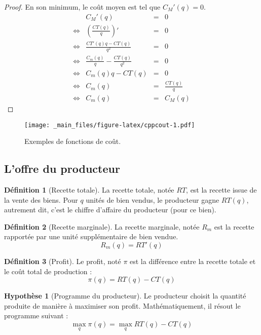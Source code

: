 \documentclass[
  a4paper,
]{book}
\theoremstyle{definition}
\newtheorem{definition}{Définition}[chapter]
\theoremstyle{definition}
\theoremstyle{definition}
\theoremstyle{definition}
\newtheorem{hypothesis}{Hypothèse}[chapter]
\theoremstyle{remark}
\begin{document}
\begin{proof}
En son minimum, le coût moyen est tel que \(C_M'(q)=0\).
\[
\begin{array}{crcl}
&C_M'(q)&=&0\\
\Leftrightarrow & \left(\frac{CT(q)}{q}\right)'&=& 0\\
\Leftrightarrow & \frac{CT'(q)q-CT(q)}{q^2}&=& 0\\
\Leftrightarrow & \frac{C_m(q)}{q}-\frac{CT(q)}{q^2}&=& 0\\
\Leftrightarrow & C_m(q)q-CT(q)&=& 0\\
\Leftrightarrow & C_m(q)&=& \frac{CT(q)}{q}\\
\Leftrightarrow & C_m(q)&=& C_M(q)
\end{array}
\]
\end{proof}

\begin{figure}
\centering
\texttt{[image: \_main\_files/figure-latex/cppcout-1.pdf]}
\caption{\label{fig:cppcout}Exemples de fonctions de coût.}
\end{figure}

\hypertarget{loffre-du-producteur}{%
\subsection{L'offre du producteur}\label{loffre-du-producteur}}

\begin{definition}[Recette totale]
La recette totale, notée \(RT\), est la recette issue de la vente des biens.
Pour \(q\) unités de bien vendus, le producteur gagne \(RT(q)\), autrement dit, c'est le chiffre d'affaire du producteur (pour ce bien).
\end{definition}

\begin{definition}[Recette marginale]
La recette marginale, notée \(R_m\) est la recette rapportée par une unité supplémentaire de bien vendue.
\[R_m(q)=RT'(q)\]
\end{definition}

\begin{definition}[Profit]
Le profit, noté \(\pi\) est la différence entre la recette totale et le coût total de production :
\[\pi(q)=RT(q)-CT(q)\]
\end{definition}

\begin{hypothesis}[Programme du producteur]
\protect\hypertarget{hyp:programmeproducteur}{}\label{hyp:programmeproducteur}Le producteur choisit la quantité produite de manière à maximiser son profit.
Mathématiquement, il résout le programme suivant :
\[\max_q\pi(q)=\max_q RT(q)-CT(q)\]
\end{hypothesis}
\end{document}
